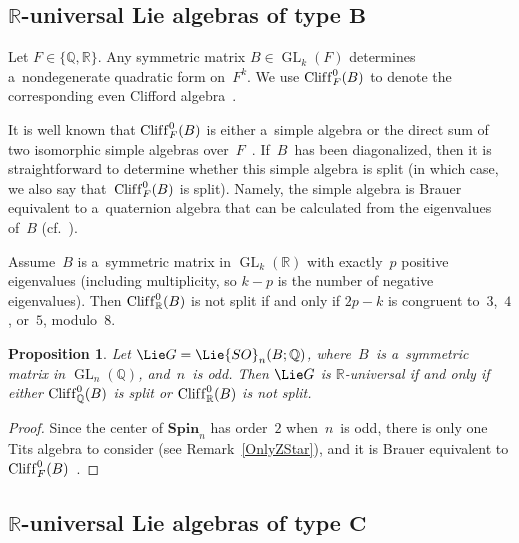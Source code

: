 \documentclass[pdftex]{sigma}
\DeclareMathOperator{\Cliff}{Clif\/f}
\DeclareMathOperator{\GL}{GL}
\numberwithin{equation}{section}
\newtheorem{prop}{Proposition}[section]
\begin{document}
\subsection[$\mathbb{R}$-universal Lie algebras of type $B$]{$\boldsymbol{\mathbb{R}}$-universal Lie algebras of type $\boldsymbol{B}$}\label{TypeB}

\begin{notation}
Let $F \in \{\mathbb{Q}, \mathbb{R}\}$.
Any symmetric matrix $B \in \GL_k(F)$ determines a~nondegenerate quadratic form on~$F^k$.
We use $\Cliff^0_F(B)$ to denote the corresponding even Clif\/ford algebra~\cite[p.~104]{Lam-IntroQuadForms}.
\end{notation}

It is well known that $\Cliff^0_F(B)$ is either a~simple algebra or the direct sum of two isomorphic simple algebras
over~$F$~\cite[Theorems~2.4 and~2.5, p.~110]{Lam-IntroQuadForms}.
If~$B$~has been diagonalized, then it is straightforward to determine whether this simple algebra is split (in which
case, we also say that~$\Cliff^0_F(B)$ is split).
Namely, the simple algebra is Brauer equivalent to a~quaternion algebra that can be calculated from the eigenvalues
of~$B$ (cf.~\cite[Corollary~3.14, p.~117]{Lam-IntroQuadForms}).

\begin{eg} Assume~$B$ is a~symmetric matrix in
$\GL_k(\mathbb{R})$ with exactly~$p$ positive eigenvalues (including multiplicity, so $k - p$ is the number of negative
eigenvalues).
Then $\Cliff^0_\mathbb{R}(B)$ is not split if and only if $2p - k$ is congruent to~$3$,~$4$, or~$5$, modulo~$8$.
\end{eg}

\begin{prop}
Let $\Lie G = \Lie{SO}_n(B; \mathbb{Q})$, where~$B$~is a~symmetric matrix in $\GL_n(\mathbb{Q})$, and~$n$~is odd.
Then $\Lie G$ is $\mathbb{R}$-universal if and only if either $\Cliff^0_\mathbb{Q}(B)$ is split or
$\Cliff^0_\mathbb{R}(B)$ is not split.
\end{prop}

\begin{proof}
Since the center of $\mathbf{Spin}_n$ has order~$2$ when~$n$~is odd, there is only one Tits algebra to consider
(see Remark~\ref{OnlyZStar}), and it is Brauer equivalent to $\Cliff^0_F(B)$~\cite[p.~378]{KnusEtAl-BookOfInvols}.
\end{proof}

\subsection[$\mathbb{R}$-universal Lie algebras of type $C$]{$\boldsymbol{\mathbb{R}}$-universal Lie algebras of type $\boldsymbol{C}$}\label{TypeC}
\end{document}
